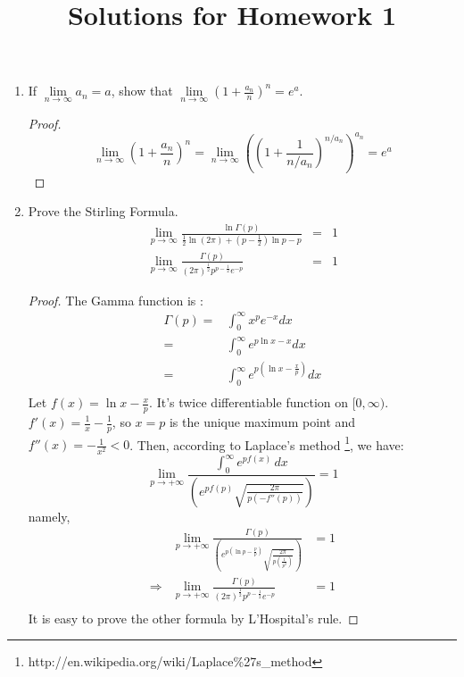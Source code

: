 \documentclass[10pt,a4paper]{article}
\title{Solutions for Homework 1}
\date{}
\begin{document}
\maketitle
\begin{enumerate}
\item
If $\lim \limits_{n\rightarrow\infty}a_n=a$, show that $\lim \limits_{n\rightarrow\infty}\left(1+\frac{a_n}{n}\right)^n=e^{a}$.
\begin{proof}
$$\lim \limits_{n\rightarrow\infty}\left(1+\frac{a_n}{n}\right)^n  = \lim \limits_{n\rightarrow\infty}\left(\left(1+\frac{1}{n/a_n}\right)^{n/a_n}\right)^{a_n} = e^a$$
\end{proof}

\item
Prove the Stirling Formula.
\begin{eqnarray*}
\lim_{p\rightarrow\infty}\frac{\ln\Gamma(p)}{\frac{1}{2}\ln(2\pi)+(p-\frac{1}{2})\ln{p}-p}&=&1\\
\lim_{p\rightarrow\infty}\frac{\Gamma(p)}{(2\pi)^{\frac{1}{2}}p^{p-\frac{1}{2}}e^{-p}}&=&1
\end{eqnarray*}
\begin{proof}
The Gamma function is :
\begin{eqnarray*}
\Gamma(p)  = &\int_0^{\infty}x^pe^{-x}dx \\
= &\int_0^{\infty}e^{p\ln x-x}dx \\
= &\int_0^{\infty}e^{p(\ln x-\frac{x}{p})}dx \\
\end{eqnarray*}
Let $f(x) = \ln x-\frac{x}{p}$. It's twice differentiable function on $[0,\infty)$.
$f'(x) = \frac{1}{x}-\frac{1}{p}$, so $x=p$ is the unique maximum point and $f''(x) = -\frac{1}{x^2}<0$. Then, according to Laplace's method \footnote{http://en.wikipedia.org/wiki/Laplace\%27s\_method}, we have:
$$\lim_{p \to +\infty}  \frac{\int_0^\infty e^{pf(x)} \, dx}{\left( e^{pf(p)}\sqrt{\frac{2 \pi}{p (-f''(p))}} \right)} =1 $$
namely,
\begin{eqnarray*}
& \lim\limits_{ p \to +\infty}  \frac{\Gamma(p)}{\left( e^{p(\ln p-\frac{p}{p})}\sqrt{\frac{2 \pi}{p (\frac{1}{p^2})}} \right)}  &= 1 \\
\Longrightarrow & \lim\limits_{p \to +\infty}  \frac{\Gamma(p)}{(2\pi)^{\frac{1}{2}}p^{p-\frac{1}{2}}e^{-p}} &= 1 \\
\end{eqnarray*}
It is easy to prove the other formula by L'Hospital's rule.
\end{proof}


\end{enumerate}
\end{document}
